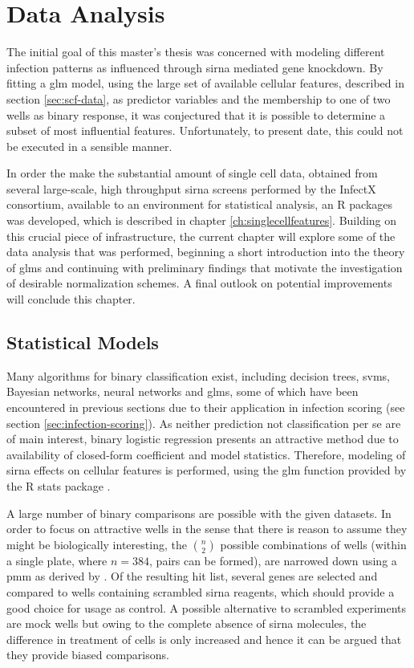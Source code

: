 \chapter{Data Analysis}
\label{ch:data-analysis}

The initial goal of this master's thesis was concerned with modeling different infection patterns as influenced through \gls{sirna} mediated gene knockdown. By fitting a \gls{glm} model, using the large set of available cellular features, described in section \ref{sec:scf-data}, as predictor variables and the membership to one of two wells as binary response, it was conjectured that it is possible to determine a subset of most influential features. Unfortunately, to present date, this could not be executed in a sensible manner.

In order the make the substantial amount of single cell data, obtained from several large-scale, high throughput \gls{sirna} screens performed by the InfectX consortium, available to an environment for statistical analysis, an R packages was developed, which is described in chapter \ref{ch:singlecellfeatures}. Building on this crucial piece of infrastructure, the current chapter will explore some of the data analysis that was performed, beginning a short introduction into the theory of \glspl{glm} and continuing with preliminary findings that motivate the investigation of desirable normalization schemes. A final outlook on potential improvements will conclude this chapter.

\section{Statistical Models}
Many algorithms for binary classification exist, including decision trees, \glspl{svm}, Bayesian networks, neural networks and \glspl{glm}, some of which have been encountered in previous sections due to their application in infection scoring (see section \ref{sec:infection-scoring}). As neither prediction not classification per se are of main interest, binary logistic regression presents an attractive method due to availability of closed-form coefficient and model statistics. Therefore, modeling of \gls{sirna} effects on cellular features is performed, using the glm function provided by the R stats package \citep{RCoreTeam2015}.

A large number of binary comparisons are possible with the given datasets. In order to focus on attractive wells in the sense that there is reason to assume they might be biologically interesting, the $n \choose 2$ possible combinations of wells (within a single plate, where $n=384$,  pairs can be formed), are narrowed down using a \gls{pmm} as derived by \cite{Ramo2014}. Of the resulting hit list, several genes are selected and compared to wells containing scrambled \gls{sirna} reagents, which should provide a good choice for usage as control. A possible alternative to scrambled experiments are mock wells but owing to the complete absence of \gls{sirna} molecules, the difference in treatment of cells is only increased and hence it can be argued that they provide biased comparisons.

